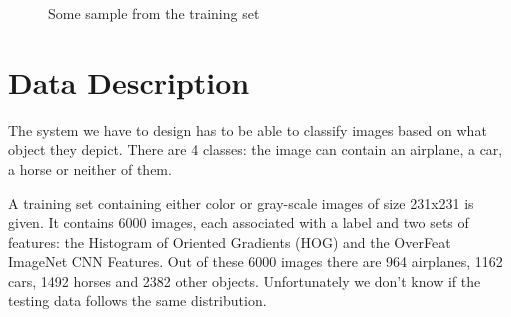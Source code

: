 \documentclass{article} %
\begin{document}
\begin{figure}[!t]
	\centering
	\caption{Some sample from the training set}
\end{figure}

\section{Data Description}

The system we have to design has to be able to classify images based on what object they depict. 
There are 4 classes: the image can contain an airplane, a car, a horse or neither of them.

A training set containing either color or gray-scale images of size 231x231 is given. It contains 6000 images, each associated with a label and two sets of features: the Histogram of Oriented Gradients (HOG) and the OverFeat ImageNet CNN Features.
Out of these 6000 images there are 964 airplanes, 1162 cars, 1492 horses and 2382 other objects.
Unfortunately we don't know if the testing data follows the same distribution.
\end{document}
